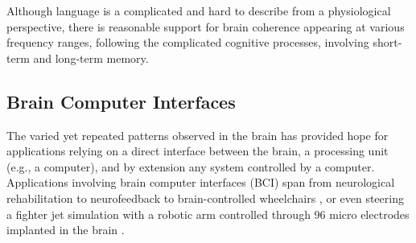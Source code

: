 
Although language is a complicated and hard to describe from a physiological perspective, there is reasonable support for brain coherence appearing at various frequency ranges, following the complicated cognitive processes, involving short-term and long-term memory.


\subsection{Brain Computer Interfaces}
The varied yet repeated patterns observed in the brain has provided hope for applications relying on a direct interface between the brain, a processing unit (e.g., a computer), and by extension any system controlled by a computer. Applications involving brain computer interfaces (BCI)  span from neurological rehabilitation \cite{daly2008brain} to neurofeedback \cite{lubar1995evaluation,fuchs2003neurofeedback} to brain-controlled wheelchairs \cite{galan2008brain}, or even steering a fighter jet simulation with a robotic arm controlled through 96 micro electrodes implanted in the brain \cite{BCIfighterJet2015}.

